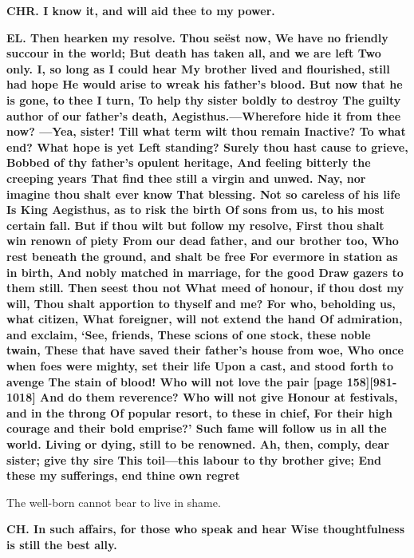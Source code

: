 \documentclass[11pt,letter]{book}
\begin{document}
\par \textbf{CHR. I know it, and will aid thee to my power.}
\par 

\par \textbf{EL. Then hearken my resolve. Thou seëst now, We have no friendly succour in the world; But death has taken all, and we are left Two only. I, so long as I could hear My brother lived and flourished, still had hope He would arise to wreak his father’s blood. But now that he is gone, to thee I turn, To help thy sister boldly to destroy The guilty author of our father’s death, Aegisthus.—Wherefore hide it from thee now? —Yea, sister! Till what term wilt thou remain Inactive? To what end? What hope is yet Left standing? Surely thou hast cause to grieve, Bobbed of thy father’s opulent heritage, And feeling bitterly the creeping years That find thee still a virgin and unwed. Nay, nor imagine thou shalt ever know That blessing. Not so careless of his life Is King Aegisthus, as to risk the birth Of sons from us, to his most certain fall. But if thou wilt but follow my resolve, First thou shalt win renown of piety From our dead father, and our brother too, Who rest beneath the ground, and shalt be free For evermore in station as in birth, And nobly matched in marriage, for the good Draw gazers to them still. Then seest thou not What meed of honour, if thou dost my will, Thou shalt apportion to thyself and me? For who, beholding us, what citizen, What foreigner, will not extend the hand Of admiration, and exclaim, ‘See, friends, These scions of one stock, these noble twain, These that have saved their father’s house from woe, Who once when foes were mighty, set their life Upon a cast, and stood forth to avenge The stain of blood! Who will not love the pair [page 158][981-1018] And do them reverence? Who will not give Honour at festivals, and in the throng Of popular resort, to these in chief, For their high courage and their bold emprise?’ Such fame will follow us in all the world. Living or dying, still to be renowned. Ah, then, comply, dear sister; give thy sire This toil—this labour to thy brother give; End these my sufferings, end thine own regret}
\par   The well-born cannot bear to live in shame.

\par \textbf{CH. In such affairs, for those who speak and hear Wise thoughtfulness is still the best ally.}
\par 
\end{document}

